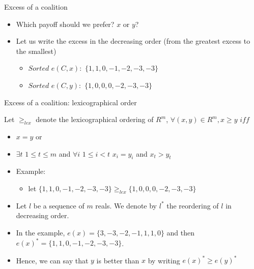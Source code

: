 \documentclass{beamer}
\begin{document}
\begin{frame}{Excess of a coalition}
    \begin{itemize}
        \item Which payoff should we prefer? $x$ or $y$?
        \item Let us write the excess in the decreasing order (from the greatest excess to the smallest)
        \begin{itemize}
            \item $Sorted$ $e(C,x):$ $\{1, 1, 0,-1,-2,-3,-3\}$
            \item $Sorted$ $e(C,y):$ $\{1, 0, 0, 0,-2,-3,-3\}$
        \end{itemize}
    \end{itemize}

\end{frame}


\begin{frame}{Excess of a coalition: lexicographical order}

    \begin{definition} \label{dfn:lexorder}
        Let $\geq_{lex}$ denote the lexicographical ordering of $R^m$,
        $\forall(x,y) \in R^m, x \geq y$ $iff$
        \begin{itemize}
            \item $x=y$ or
            \item $\exists t$ $1 \leq t \leq m$ and $\forall i$ $1 \leq i < t$ $x_i = y_i$ and $x_t > y_t$
        \end{itemize}
    \end{definition}

    \begin{itemize}
        \item Example:
        \begin{itemize}
            \item let $\{1, 1, 0,-1,-2,-3,-3\} \geq_{lex} \{1, 0, 0, 0,-2,-3,-3\}$
        \end{itemize}
        \item Let $l$ be a sequence of $m$ reals. We denote by {\color{blue} $l^*$} the {\color{blue} reordering} of {\color{blue} $l$} in {\color{blue} decreasing} order.
        \item In the example, $e(x) = \{3,-3,-2,-1, 1, 1,0\}$ and then $e(x)^* = \{1, 1, 0,-1,-2,-3,-3\}$.
        \item Hence, we can say that $y$ is better than $x$ by writing $e(x)^* \geq e(y)^*$
    \end{itemize}

\end{frame}
\end{document}
